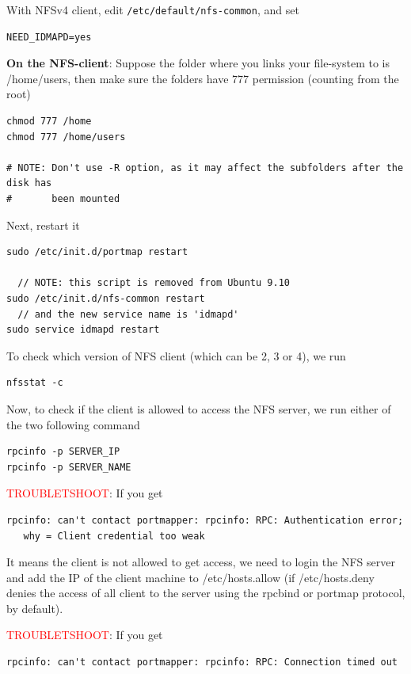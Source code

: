 With NFSv4 client, edit \verb!/etc/default/nfs-common!, and set 
\begin{verbatim}
NEED_IDMAPD=yes
\end{verbatim}

{\bf On the NFS-client}: Suppose the folder where you links your file-system to
is /home/users, then make sure the folders have 777 permission (counting from
the root)
\begin{verbatim}
chmod 777 /home
chmod 777 /home/users

# NOTE: Don't use -R option, as it may affect the subfolders after the disk has
#       been mounted
\end{verbatim}


Next, restart it
\begin{verbatim}
sudo /etc/init.d/portmap restart

  // NOTE: this script is removed from Ubuntu 9.10
sudo /etc/init.d/nfs-common restart
  // and the new service name is 'idmapd'
sudo service idmapd restart
\end{verbatim}

To check which version of NFS client (which can be 2, 3 or 4), we run
\begin{verbatim}
nfsstat -c
\end{verbatim}
Now, to check if the client is allowed to access the NFS server, we run either
of the two following command
\begin{verbatim}
rpcinfo -p SERVER_IP
rpcinfo -p SERVER_NAME
\end{verbatim}

\textcolor{red}{TROUBLETSHOOT}: If you get 
\begin{verbatim}
rpcinfo: can't contact portmapper: rpcinfo: RPC: Authentication error; 
   why = Client credential too weak
\end{verbatim}
It means the client is not allowed to get access, we need to login the NFS
server and add the IP of the client machine to /etc/hosts.allow (if
/etc/hosts.deny denies the access of all client to the server using the rpcbind
or portmap protocol, by default). 

\textcolor{red}{TROUBLETSHOOT}: If you get 
\begin{verbatim}
rpcinfo: can't contact portmapper: rpcinfo: RPC: Connection timed out 
\end{verbatim}

